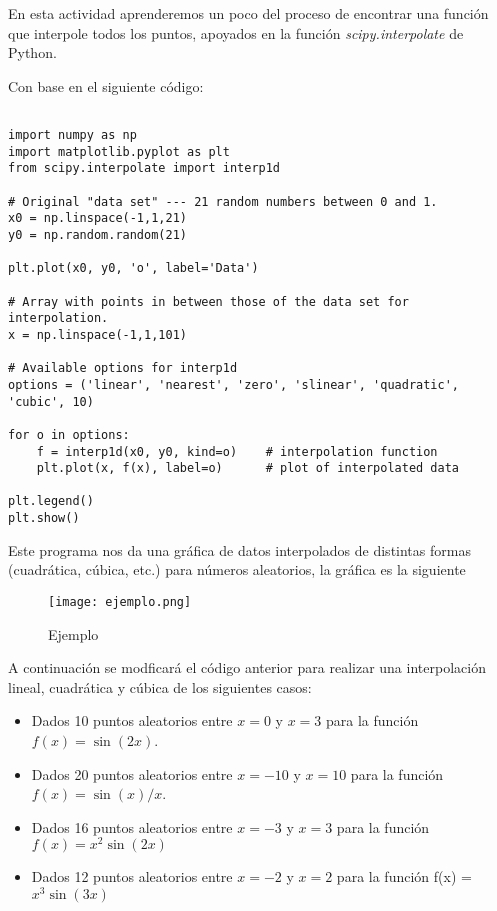 \documentclass[a4 paper]{article}
\numberwithin{equation}{section}
\newcommand{\0}{\mathbf{0}}
\begin{document}
En esta actividad aprenderemos un poco del proceso de encontrar una funci\'on que interpole todos los puntos, apoyados en la funci\'on {\it scipy.interpolate} de Python.

Con base en el siguiente c\'odigo:

\begin{verbatim}

import numpy as np
import matplotlib.pyplot as plt
from scipy.interpolate import interp1d

# Original "data set" --- 21 random numbers between 0 and 1.
x0 = np.linspace(-1,1,21)
y0 = np.random.random(21)

plt.plot(x0, y0, 'o', label='Data')

# Array with points in between those of the data set for interpolation.
x = np.linspace(-1,1,101)

# Available options for interp1d
options = ('linear', 'nearest', 'zero', 'slinear', 'quadratic', 'cubic', 10)

for o in options:
    f = interp1d(x0, y0, kind=o)    # interpolation function
    plt.plot(x, f(x), label=o)      # plot of interpolated data

plt.legend()
plt.show()
\end{verbatim}

Este programa nos da una gr\'afica de datos interpolados de distintas formas (cuadr\'atica, c\'ubica, etc.) para n\'umeros aleatorios, la gr\'afica es la siguiente

\vspace{0.5cm}

\begin{figure}[!ht]
  \centering
      \texttt{[image: ejemplo.png]}
  \caption{Ejemplo}
\end{figure}

\vspace{0.5cm}

A continuaci\'on se modficar\'a el c\'odigo anterior para realizar una interpolaci\'on lineal, cuadr\'atica y c\'ubica de los siguientes casos:\\

\begin{itemize}
\item Dados 10 puntos aleatorios entre $x=0$ y $x=3$ para la función $f(x) = \sin(2x)$.
\item Dados 20 puntos aleatorios entre $x=-10$ y $x=10$ para la función $f(x) = \sin(x)/x$.
\item Dados 16 puntos aleatorios entre $x=-3$ y $x=3$ para la función $f(x) = x^{2}\sin(2x)$
\item Dados 12 puntos aleatorios entre $x=-2$ y $x=2$ para la función f(x) = $x^{3}\sin(3x)$
\end{itemize}
\end{document}
